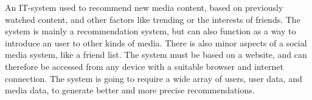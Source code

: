 An IT-system used to recommend new media content, based on previously watched content, and other factors like trending or the interests of friends. The system is mainly a recommendation system, but can also function as a way to introduce an user to other kinds of media. There is also minor aspects of a social media system, like a friend list. The system must be based on a website, and can therefore be accessed from any device with a suitable browser and internet connection. The system is going to require a wide array of users, user data, and media data, to generate better and more precise recommendations.
